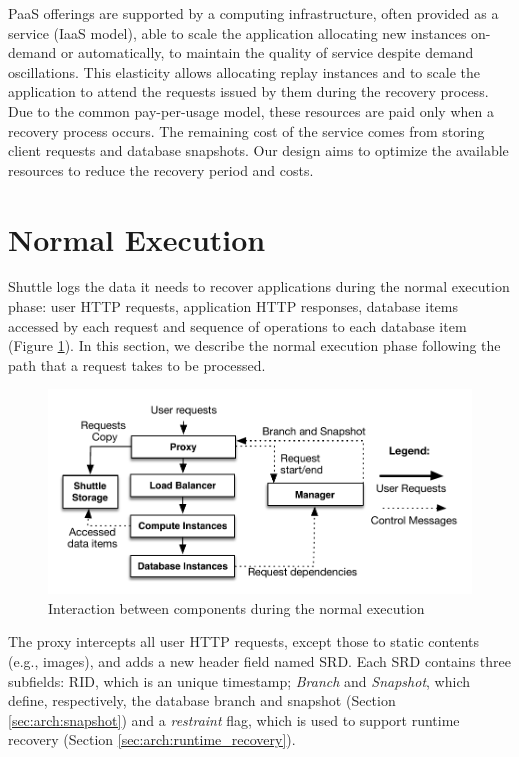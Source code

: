 PaaS offerings are supported by a computing infrastructure, often provided as a service (IaaS model), able to scale the application allocating new instances on-demand or automatically, to maintain the quality of service despite demand oscillations. This elasticity  allows allocating replay instances and to scale the application to attend the requests issued by them during the recovery process. Due to the common pay-per-usage model, these resources are paid only when a recovery process occurs. The remaining cost of the service comes from storing client requests and database snapshots. Our design aims to optimize the available resources to reduce the recovery period and costs. 


\section{Normal Execution}
\label{sec:arch:normal_execution}
Shuttle logs the data it needs to recover applications during the normal execution phase: user \ac{HTTP} requests, application \ac{HTTP} responses, database items accessed by each request and sequence of operations to each database item (Figure \ref{fig:normal_execution}). In this section, we describe the normal execution phase following the path that a request takes to be processed.

\begin{figure}
\centering
\includegraphics[width=130mm]{images/normalExecution}
\caption{Interaction between components during the normal execution}
\label{fig:normal_execution}
\end{figure}

The proxy intercepts all user \ac{HTTP} requests, except those to static contents (e.g., images), and adds a new header field named \ac{SRD}. Each \ac{SRD} contains three subfields: \ac{RID}, which is an unique timestamp; \emph{Branch} and \emph{Snapshot}, which define, respectively, the database branch and snapshot (Section \ref{sec:arch:snapshot}) and a \emph{restraint} flag, which is used to support runtime recovery (Section \ref{sec:arch:runtime_recovery}). 

